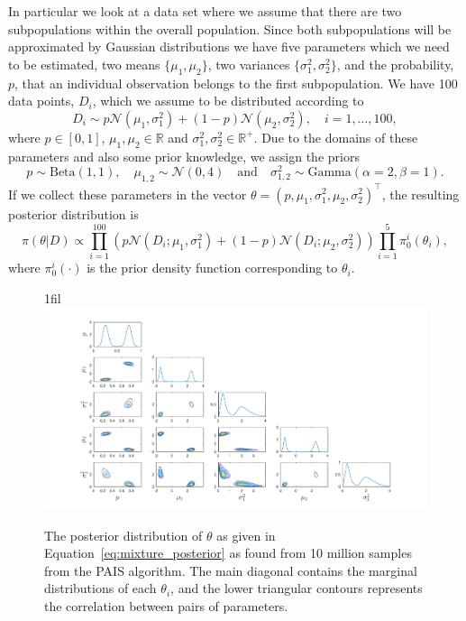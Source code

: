\documentclass[final]{siamltex}
\makeatletter
\newcommand*{\centerfloat}{%
  \parindent \z@
  \leftskip \z@ \@plus 1fil \@minus \textwidth
  \rightskip\leftskip
  \parfillskip \z@skip}
\makeatother
\begin{document}
In particular we look at a data set where we assume that there are two
subpopulations within the overall population. Since both
subpopulations will be approximated by Gaussian distributions we have
five parameters which we need to be estimated, two means $\{\mu_{1}, \mu_{2}\}$,
two variances $\{\sigma^2_{1}, \sigma^2_{2}\}$, and the probability, $p$, that an
individual observation belongs to the first subpopulation. We have 100
data points, $D_i$, which we assume to be distributed according to
\[
	D_i \sim p\mathcal{N}(\mu_1, \sigma^2_1) + (1-p)\mathcal{N}
	(\mu_2, \sigma^2_2), \quad i = 1,\dots,100,
\]
where $p \in [0, 1]$, $\mu_{1},\mu_2 \in \mathbb{R}$ and $\sigma^2_{1},\sigma^2_2
\in \mathbb{R}^+$. Due to the domains of these parameters and also
some prior knowledge, we assign the priors
\[
	p \sim \text{Beta}(1,1), \quad \mu_{1,2} \sim \mathcal{N}(0, 4)
	 \quad \text{and} \quad \sigma^2_{1,2} \sim \text{Gamma}
	(\alpha=2, \beta=1).
\]
If we collect these parameters in the vector $\theta = (p, \mu_1,
\sigma^2_1, \mu_2, \sigma^2_2)^\top$, the resulting posterior
distribution is
\begin{equation}\label{eq:mixture_posterior}
	\pi(\theta|D) \propto \prod\limits_{i=1}^{100} (p\mathcal{N}
	(D_i;\mu_1, \sigma^2_1) + (1-p)\mathcal{N}(D_i;\mu_2, \sigma^2_2))
	\prod\limits_{i=1}^5 \pi_0^i(\theta_i),
\end{equation}
where $\pi_0^i(\cdot)$ is the prior density function corresponding to $\theta_i$.

\begin{figure}[htb]
\centerfloat
\includegraphics[width=1.2\textwidth]{"figures/PAIS_best_posterior"}
\caption{The posterior distribution of $\theta$ as given in
Equation~\eqref{eq:mixture_posterior} as found from 10 million samples
from the PAIS algorithm. The main diagonal contains the marginal
distributions of each $\theta_i$, and the lower triangular contours
represents the correlation between pairs of parameters.}
\label{fig:mixture_posterior}
\end{figure}
\end{document}
